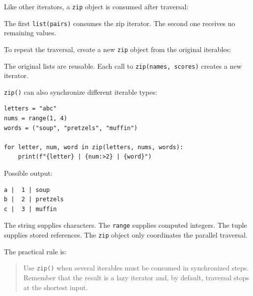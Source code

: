 Like other iterators, a \texttt{zip} object is consumed after traversal:

The first \texttt{list(pairs)} consumes the zip iterator. The second one receives no remaining values.

To repeat the traversal, create a new \texttt{zip} object from the original iterables:

The original lists are reusable. Each call to \texttt{zip(names, scores)} creates a new iterator.

\texttt{zip()} can also synchronize different iterable types:

\begin{verbatim}
letters = "abc"
nums = range(1, 4)
words = ("soup", "pretzels", "muffin")

for letter, num, word in zip(letters, nums, words):
    print(f"{letter} | {num:>2} | {word}")
\end{verbatim}

Possible output:

\begin{verbatim}
a |  1 | soup
b |  2 | pretzels
c |  3 | muffin
\end{verbatim}

The string supplies characters. The \texttt{range} supplies computed integers. The tuple supplies stored references. The \texttt{zip} object only coordinates the parallel traversal.

The practical rule is:

\begin{quote}
Use \texttt{zip()} when several iterables must be consumed in synchronized steps. Remember that the result is a lazy iterator and, by default, traversal stops at the shortest input.
\end{quote}